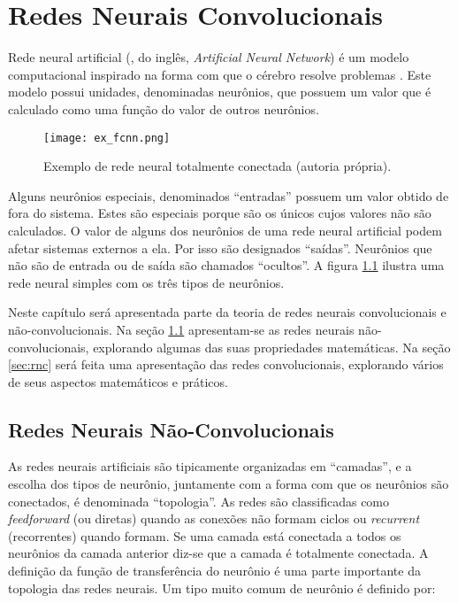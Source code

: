 
\chapter{Redes Neurais Convolucionais}

Rede neural artificial (, do inglês, \emph{Artificial Neural Network}) é um modelo computacional inspirado na forma com
que o cérebro resolve problemas \cite{gilbert2000build}. Este modelo possui
unidades, denominadas neurônios, que possuem um valor que é calculado como uma
função do valor de outros neurônios.

\begin{figure}[!htb]
	\centering
	\texttt{[image: ex\_fcnn.png]}
	\caption[Exemplo de rede neural totalmente conectada]{
		Exemplo de rede neural totalmente conectada (autoria própria).}
	\label{fig:ex_fcnn}
\end{figure}

Alguns neurônios especiais, denominados “entradas” possuem um valor obtido de
fora do sistema. Estes são especiais porque são os únicos cujos valores não são
calculados. O valor de alguns dos neurônios de uma rede neural artificial podem
afetar sistemas externos a ela. Por isso são designados “saídas”. Neurônios que
não são de entrada ou de saída são chamados “ocultos”. A figura
\ref{fig:ex_fcnn} ilustra uma rede neural simples com os três tipos de
neurônios.

Neste capítulo será apresentada parte da teoria de redes neurais convolucionais
e não-convolucionais. Na seção \ref{sec:rnnc} apresentam-se as redes neurais
não-convolucionais, explorando algumas das suas propriedades matemáticas. Na
seção \ref{sec:rnc} será feita uma apresentação das redes convolucionais,
explorando vários de seus aspectos matemáticos e práticos.

\section{Redes Neurais Não-Convolucionais} \label{sec:rnnc}
As redes neurais artificiais são tipicamente organizadas em “camadas”, e a
escolha dos tipos de neurônio, juntamente com a forma com que os neurônios são
conectados, é denominada “topologia”. As redes são classificadas como
\emph{feedforward} (ou diretas) quando as conexões não formam ciclos ou
\emph{recurrent} (recorrentes) quando formam. Se
uma camada está conectada a todos os neurônios da camada anterior diz-se que a
camada é totalmente conectada.
A definição da função de transferência do neurônio é uma parte importante da
topologia das redes neurais. Um tipo muito comum de neurônio é definido por:

